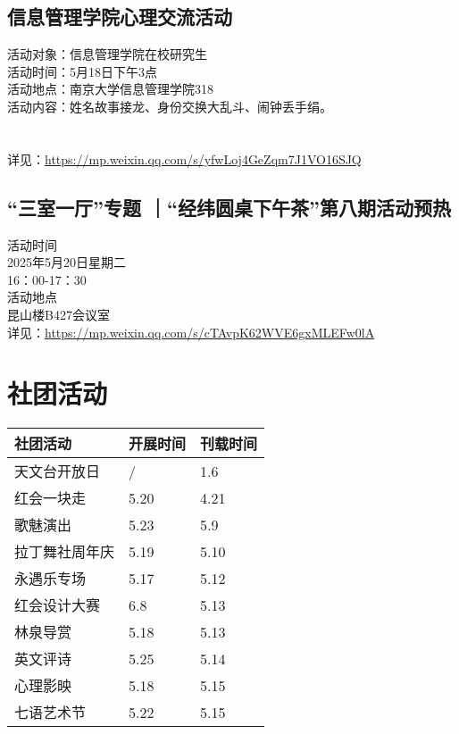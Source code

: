 \documentclass[letterpaper, 12pt]{article}
\begin{document}
\begin{multicols}{2}
\subsection{信息管理学院心理交流活动} %
活动对象：信息管理学院在校研究生
\\活动时间：5月18日下午3点
\\活动地点：南京大学信息管理学院318
\\活动内容：姓名故事接龙、身份交换大乱斗、闹钟丢手绢。
\\
\\
\\详见：\url{https://mp.weixin.qq.com/s/yfwLoj4GeZqm7J1VO16SJQ}

\subsection{“三室一厅”专题 ｜“经纬圆桌下午茶”第八期活动预热} %
活动时间
\\2025年5月20日星期二
\\16：00-17：30
\\活动地点
\\昆山楼B427会议室
\\详见：\url{https://mp.weixin.qq.com/s/cTAvpK62WVE6gxMLEFw0lA}

\section{社团活动}
\begin{tabular}{|>{\centering\arraybackslash}m{}|m{}|m{}|}
    \hline
    社团活动 & 开展时间 & 刊载时间\\
    \hline\hline
    天文台开放日 & / & 1.6\\
    红会一块走 & 5.20 & 4.21\\
    歌魅演出 & 5.23 & 5.9\\
    拉丁舞社周年庆 & 5.19 & 5.10\\
    永遇乐专场 & 5.17 & 5.12\\
    红会设计大赛 & 6.8 & 5.13\\
    林泉导赏 & 5.18 & 5.13\\
    英文评诗 & 5.25 & 5.14\\
    心理影映 & 5.18 & 5.15\\
    七语艺术节 & 5.22 & 5.15\\
    \hline
\end{tabular}



\end{multicols}
\end{document}
